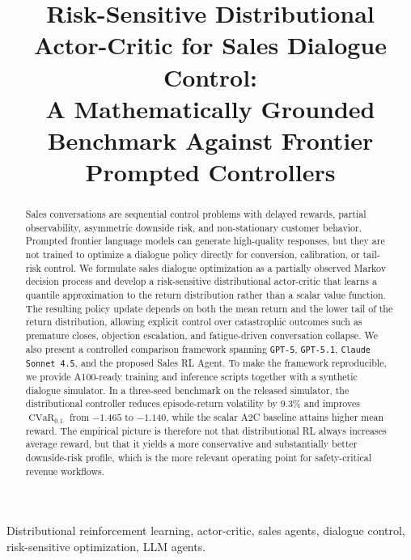 \documentclass[conference]{IEEEtran}
\newcommand{\cvar}{\operatorname{CVaR}}
\begin{document}
\title{Risk-Sensitive Distributional Actor-Critic for Sales Dialogue Control:\\
A Mathematically Grounded Benchmark Against Frontier Prompted Controllers}

\author{
}

\maketitle

\begin{abstract}
Sales conversations are sequential control problems with delayed rewards, partial observability, asymmetric downside risk, and non-stationary customer behavior. Prompted frontier language models can generate high-quality responses, but they are not trained to optimize a dialogue policy directly for conversion, calibration, or tail-risk control. We formulate sales dialogue optimization as a partially observed Markov decision process and develop a risk-sensitive distributional actor-critic that learns a quantile approximation to the return distribution rather than a scalar value function. The resulting policy update depends on both the mean return and the lower tail of the return distribution, allowing explicit control over catastrophic outcomes such as premature closes, objection escalation, and fatigue-driven conversation collapse. We also present a controlled comparison framework spanning \texttt{GPT-5}, \texttt{GPT-5.1}, \texttt{Claude Sonnet 4.5}, and the proposed Sales RL Agent. To make the framework reproducible, we provide A100-ready training and inference scripts together with a synthetic dialogue simulator. In a three-seed benchmark on the released simulator, the distributional controller reduces episode-return volatility by 9.3\% and improves \(\cvar_{0.1}\) from \(-1.465\) to \(-1.140\), while the scalar A2C baseline attains higher mean reward. The empirical picture is therefore not that distributional RL always increases average reward, but that it yields a more conservative and substantially better downside-risk profile, which is the more relevant operating point for safety-critical revenue workflows.
\end{abstract}

\begin{IEEEkeywords}
Distributional reinforcement learning, actor-critic, sales agents, dialogue control, risk-sensitive optimization, LLM agents.
\end{IEEEkeywords}
\end{document}
